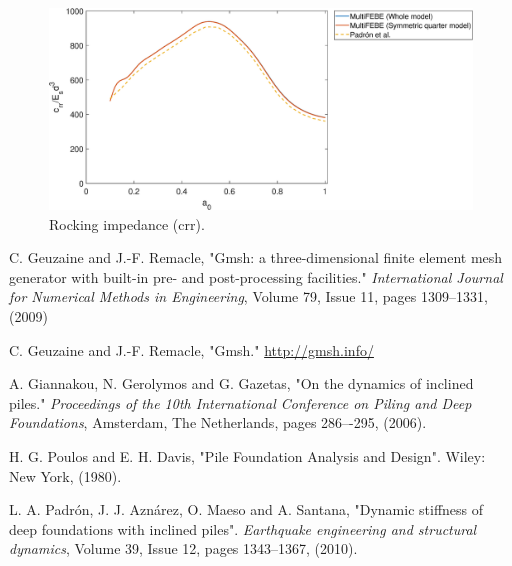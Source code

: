 \documentclass[a4]{article}
\begin{document}
\begin{figure}[h!]
	\centering
	\includegraphics[scale=0.5]{crr_2x2_group.eps}
	\caption{Rocking impedance (crr).}
	\label{fig:crr_2x2_group}
\end{figure}

\FloatBarrier


\begin{thebibliography}{99}
	 C. Geuzaine and J.-F. Remacle, "Gmsh: a three-dimensional finite element mesh generator with built-in pre- and post-processing facilities." \textit{International Journal for Numerical Methods in Engineering}, Volume 79, Issue 11, pages 1309--1331, (2009)
	
	 C. Geuzaine and J.-F. Remacle, "Gmsh." \url{http://gmsh.info/}
	
	  A. Giannakou, N. Gerolymos and G. Gazetas, "On the dynamics of inclined piles." \textit{Proceedings of the 10th International	Conference on Piling and Deep Foundations}, Amsterdam, The Netherlands, pages 286–-295, (2006).
	
	 H. G. Poulos and E. H. Davis, "Pile Foundation Analysis and Design". Wiley: New York, (1980).
	
	 L. A. Padrón, J. J. Aznárez, O. Maeso and A. Santana, "Dynamic stiffness of deep foundations with inclined piles". \textit{Earthquake engineering and structural dynamics}, Volume 39, Issue 12, pages 1343--1367, (2010).
\end{thebibliography}
\end{document}
